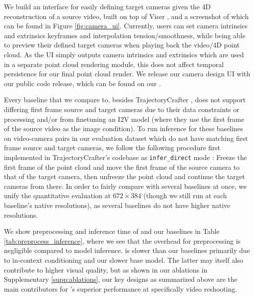 We build an interface for easily defining target cameras given the 4D reconstruction of a source video, built on top of Viser \cite{yi2025viser}, and a screenshot of which can be found in Figure \ref{fig:camera_ui}. Currently, users can set camera intrinsics and extrinsics keyframes and interpolation tension/smoothness, while being able to preview their defined target cameras when playing back the video/4D point cloud. As the UI simply outputs camera intrinsics and extrinsics which are used in a separate point cloud rendering module, this does not affect temporal persistence for our final point cloud render. We release our camera design UI with our public code release, which can be found on our \projectpage.

Every baseline that we compare \methodname to, besides TrajectoryCrafter \cite{yu2025trajcraft}, does not support differing first frame source and target cameras due to their data constraints or processing and/or from finetuning an I2V model (where they use the first frame of the source video as the image condition). To run inference for these baselines on video-camera pairs in our evaluation dataset which do not have matching first frame source and target cameras, we follow the following procedure first implemented in TrajectoryCrafter's codebase as \texttt{infer\_direct} mode \cite{yu2025trajcraft}: Freeze the first frame of the point cloud and move the first frame of the source camera to that of the target camera, then unfreeze the point cloud and continue the target cameras from there. In order to fairly compare with several baselines at once, we unify the quantitative evaluation at $672 \times 384$ (though we still run at each baseline's native resolutions), as several baselines do not have higher native resolutions.



We show preprocessing and inference time of \methodname and our baselines in Table \ref{tab:preprocess_inference}, where we see that the overhead for preprocessing is negligible compared to model inference. \methodname is slower than our baselines primarily due to in-context conditioning and our slower base model. The latter may itself also contribute to higher visual quality, but as shown in our ablations in Supplementary \ref{supp:ablations}, our key designs as summarized above are the main contributors for \methodname's superior performance at specifically video reshooting.


